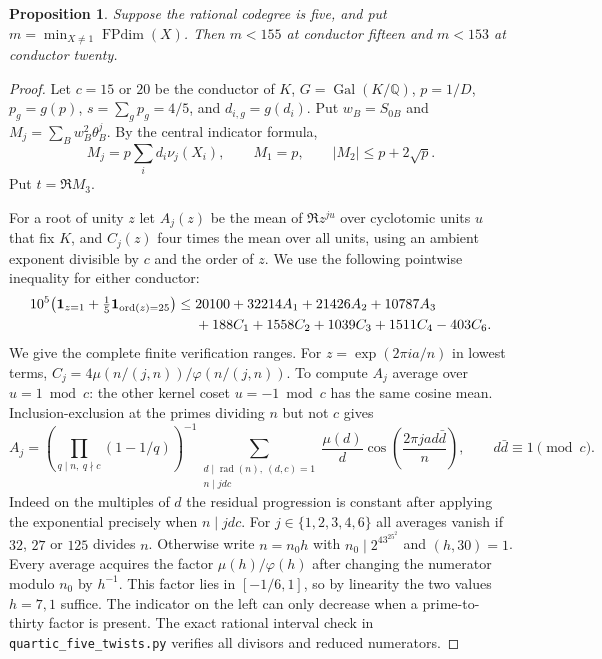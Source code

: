 \documentclass[11pt,a4paper]{article}
\newtheorem{proposition}[theorem]{Proposition}
\numberwithin{equation}{section}
\begin{document}
\begin{proposition}\label{prop:quartic-five-small}
Suppose the rational codegree is five, and put $m=\min_{X\ne1}\operatorname{FPdim}(X)$. Then $m<155$ at conductor fifteen and $m<153$ at conductor twenty.
\end{proposition}
\begin{proof}
Let $c=15$ or $20$ be the conductor of $K$, $G=\operatorname{Gal}(K/\mathbb Q)$, $p=1/D$, $p_g=g(p)$, $s=\sum_g p_g=4/5$, and $d_{i,g}=g(d_i)$. Put $w_B=S_{0B}$ and $M_j=\sum_Bw_B^2\theta_B^j$. By the central indicator formula,
\[
 M_j=p\sum_i d_i\nu_j(X_i),\qquad M_1=p,\qquad |M_2|\le p+2\sqrt p.
\]
Put $t=\Re M_3$.

For a root of unity $z$ let $A_j(z)$ be the mean of $\Re z^{ju}$ over cyclotomic units $u$ that fix $K$, and $C_j(z)$ four times the mean over all units, using an ambient exponent divisible by $c$ and the order of $z$. We use the following pointwise inequality for either conductor:
\begin{align*}
 10^5\bigl({\bf1}_{z=1}+\tfrac15{\bf1}_{\operatorname{ord}(z)=25}\bigr)
 \le{}&20100+32214A_1+21426 A_2+10787 A_3\\
 &+188 C_1+1558 C_2+1039 C_3+1511 C_4-403 C_6 .
\end{align*}
We give the complete finite verification ranges. For $z=\exp(2\pi i a/n)$ in lowest terms, $C_j=4\mu(n/(j,n))/\varphi(n/(j,n))$. To compute $A_j$ average over $u=1\bmod c$: the other kernel coset $u=-1\bmod c$ has the same cosine mean. Inclusion-exclusion at the primes dividing $n$ but not $c$ gives
\[
 A_j=\left(\prod_{q\mid n,\ q\nmid c}(1-1/q)\right)^{-1}
 \sum_{\substack{d\mid\operatorname{rad}(n),\ (d,c)=1\\n\mid jdc}}
 \frac{\mu(d)}d
 \cos\left(\frac{2\pi ja d\bar d}{n}\right),\qquad d\bar d\equiv1\pmod c.
\]
Indeed on the multiples of $d$ the residual progression is constant after applying the exponential precisely when $n\mid jdc$. For $j\in\{1,2,3,4,6\}$ all averages vanish if $32$, $27$ or $125$ divides $n$. Otherwise write $n=n_0 h$ with $n_0\mid 2^43^25^2$ and $(h,30)=1$. Every average acquires the factor $\mu(h)/\varphi(h)$ after changing the numerator modulo $n_0$ by $h^{-1}$. This factor lies in $[-1/6,1]$, so by linearity the two values $h=7,1$ suffice. The indicator on the left can only decrease when a prime-to-thirty factor is present. The exact rational interval check in \texttt{quartic\_five\_twists.py} verifies all divisors and reduced numerators.


\end{proof}
\end{document}
